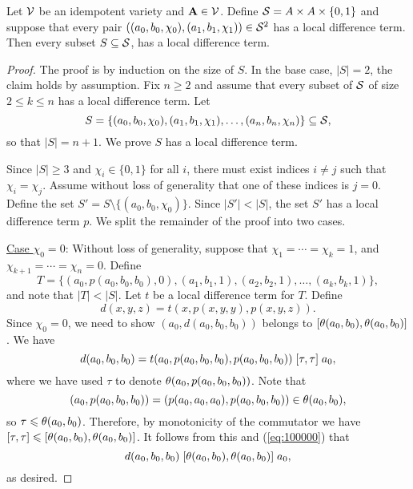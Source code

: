 \begin{thm} %
  \label{thm:local-diff-terms}
  Let $\mathcal{V}$ be an idempotent variety and
  $\mathbf{A} \in \mathcal{V}$. Define
  $\mathcal{S}= A \times A \times \{0,1\}$
  and suppose that every pair
  $((a_0, b_0, \chi_0), (a_1, b_1, \chi_1)) \in \mathcal{S}^2$
  has a local difference term.
  Then every subset $S \subseteq \mathcal{S}$,
  has a local difference term.
\end{thm}
\begin{proof}
The proof is by induction on the size of $S$.  In the base case, $|S| = 2$,
the claim holds by assumption.
Fix $n\geq 2$ and assume that every subset of $\mathcal{S}$ of size $2\leq k \leq n$ has a local
difference term. Let
\[
S = \{(a_0, b_0, \chi_0), (a_1, b_1, \chi_1), \dots, (a_{n}, b_{n},\chi_{n})\} \subseteq \mathcal{S},\]
so that $|S| = n+1$.  We prove $S$ has a local difference term.

Since $|S| \geq 3$ and $\chi_i \in \{0,1\}$ for all $i$, there must exist
indices $i\neq j$ such that $\chi_i = \chi_j$. Assume without loss of generality
that one of these indices is $j=0$.  Define
the set
$S' = S \setminus \{(a_0, b_0, \chi_0)\}$.
Since $|S'| < |S|$, the set $S'$ has a local difference term $p$.
We split the remainder of the proof into two cases.

\vskip3mm

\noindent \underline{Case $\chi_0 = 0$}:
Without loss of generality, suppose that $\chi_1 = %
\cdots =\chi_k = 1$,
and $\chi_{k+1} %
= \cdots = \chi_{n} = 0$. Define %
\[T = \{(a_0, p(a_0, b_0, b_0), 0),
(a_1, b_1, 1), (a_2, b_2, 1), 
\dots, (a_k, b_k, 1)\},\] and 
note that $|T| < |S|$.
Let $t$ be a local difference term for $T$.
Define
\[
d(x,y,z) = t(x, p(x,y,y), p(x,y,z)).
\]
Since $\chi_0 =0$, we need to show
$(a_0, d(a_0,b_0,b_0))$ belongs to $\mathrel{[\theta(a_0,b_0), \theta(a_0,b_0)]}$.
We have
\begin{equation}
    \label{eq:100000}
  d(a_0,b_0,b_0) =
  t(a_0, p(a_0,b_0,b_0), p(a_0,b_0,b_0))\comm{\tau}{\tau} a_0,
\end{equation}
where we have used $\tau$ to denote $\theta(a_0, p(a_0,b_0,b_0))$.
Note that
\[(a_0, p(a_0,b_0,b_0)) = (p(a_0,a_0,a_0), p(a_0,b_0,b_0)) \in \theta(a_0, b_0),\]
so $\tau\leqslant \theta(a_0,b_0)$. Therefore,
by monotonicity of the commutator we have
$\mathrel{[\tau, \tau]} {\leqslant} \mathrel{[\theta(a_0,b_0), \theta(a_0,b_0)]}$.
It follows from this and (\ref{eq:100000}) that
\[d(a_0,b_0,b_0)\mathrel{[\theta(a_0,b_0), \theta(a_0,b_0)]} a_0,\]
as desired.


\end{proof}
